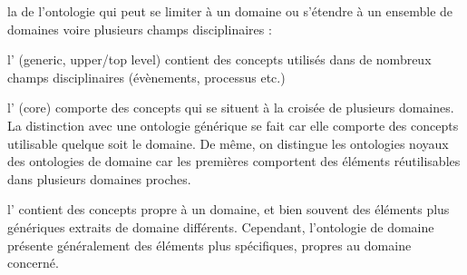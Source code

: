\begin{liste}
	\item la  de l'ontologie qui peut se limiter à un domaine ou s'étendre à un ensemble de domaines voire plusieurs champs disciplinaires : 
	\begin{liste}
		\item l' (generic, upper/top level) contient des concepts utilisés dans de nombreux champs disciplinaires (évènements, processus etc.)
		\item l' (core) comporte des concepts qui se situent à la croisée de plusieurs domaines. 
		La distinction avec une ontologie générique se fait car elle comporte des concepts utilisable quelque soit le domaine.
		De même, on distingue les ontologies noyaux des ontologies de domaine car les premières comportent des éléments réutilisables dans plusieurs domaines proches. 
		\item l' contient des concepts propre à un domaine, et bien souvent des éléments plus génériques extraits de domaine différents.
		Cependant, l'ontologie de domaine présente généralement des éléments plus spécifiques, propres au domaine concerné. 
	\end{liste}
\end{liste}